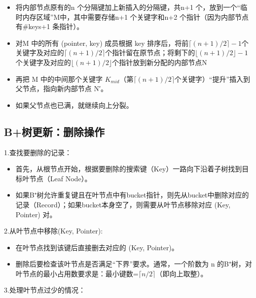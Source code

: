 \begin{enumerate}
       \begin{itemize}
          \item 将内部节点原有的n 个分隔键加上新插入的分隔键，共n+1 个，放到一个“临时内存区域”M中，其中需要存储n+1 个关键字和n+2 个指针（因为内部节点有\#keys+1 条指针）。
          \item 对M 中的所有 (pointer, key) 成员根据 key 排序后，将前$\lceil (n+1)/2 \rceil-1$个关键字及对应的$\lceil (n+1)/2 \rceil$个指针留在原节点；将剩下的$\lfloor (n+1)/2 \rfloor -1$个关键字及对应的$\lfloor (n+1)/2 \rfloor$个指针放到新分配的内部节点N
          \item 再把 M 中的中间那个关键字 $K_{mid}$（第$\lceil (n+1)/2 \rceil$个关键字）“提升”插入到父节点，指向新内部节点 N′。
          \item 如果父节点也已满，就继续向上分裂。
       \end{itemize}
\end{enumerate}

\subsection{B+树更新：删除操作}

1.查找要删除的记录：

\begin{itemize}
    \item 首先，从根节点开始，根据要删除的搜索键（Key）一路向下沿着子树找到目标叶节点（Leaf Node）。
    \item 如果B⁺树允许重复键且在叶节点中有bucket指针，则先从bucket中删除对应的记录（Record）；如果bucket本身空了，则需要从叶节点移除对应 (Key, Pointer) 对。
\end{itemize}

2.从叶节点中移除(Key, Pointer):

\begin{itemize}
    \item 在叶节点找到该键后直接删去对应的 (Key, Pointer)。
    \item 删除后要检查该叶节点是否满足“下界”要求。通常，一个阶数为 n 的B⁺树，对叶节点的最小占用数要求是：最小键数=$\lceil n/2 \rceil$（即向上取整）。
\end{itemize}

3.处理叶节点过少的情况：

